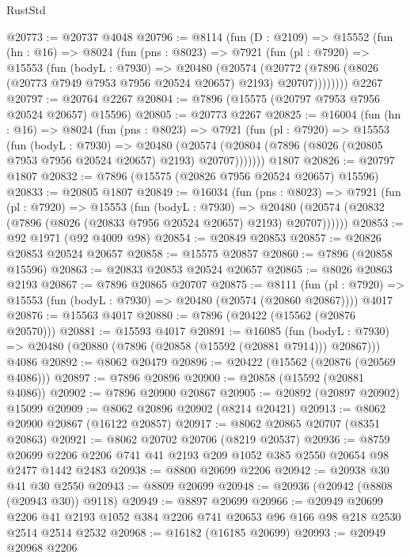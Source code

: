 \begin{lexlean}{RustStd}
\begin{coremodule}
@20773 := @20737 @4048
@20796 := @8114
    (fun (D : @2109) =>
    @15552
      (fun (hn : @16) =>
      @8024
        (fun (pns : @8023) =>
        @7921
          (fun (pl : @7920) =>
          @15553
            (fun (bodyL : @7930) =>
            @20480
              (@20574
                (@20772 (@7896 (@8026 (@20773 @7949 @7953 @7956 @20524 @20657) @2193) @20707))))))))
    @2267
@20797 := @20764 @2267
@20804 := @7896 (@15575 (@20797 @7953 @7956 @20524 @20657) @15596)
@20805 := @20773 @2267
@20825 := @16004
    (fun (hn : @16) =>
    @8024
      (fun (pns : @8023) =>
      @7921
        (fun (pl : @7920) =>
        @15553
          (fun (bodyL : @7930) =>
          @20480
            (@20574 (@20804 (@7896 (@8026 (@20805 @7953 @7956 @20524 @20657) @2193) @20707)))))))
    @1807
@20826 := @20797 @1807
@20832 := @7896 (@15575 (@20826 @7956 @20524 @20657) @15596)
@20833 := @20805 @1807
@20849 := @16034
    (fun (pns : @8023) =>
    @7921
      (fun (pl : @7920) =>
      @15553
        (fun (bodyL : @7930) =>
        @20480 (@20574 (@20832 (@7896 (@8026 (@20833 @7956 @20524 @20657) @2193) @20707))))))
@20853 := @92 @1971 (@92 @4009 @98)
@20854 := @20849 @20853
@20857 := @20826 @20853 @20524 @20657
@20858 := @15575 @20857
@20860 := @7896 (@20858 @15596)
@20863 := @20833 @20853 @20524 @20657
@20865 := @8026 @20863 @2193
@20867 := @7896 @20865 @20707
@20875 := @8111
    (fun (pl : @7920) => @15553 (fun (bodyL : @7930) => @20480 (@20574 (@20860 @20867))))
    @4017
@20876 := @15563 @4017
@20880 := @7896 (@20422 (@15562 (@20876 @20570)))
@20881 := @15593 @4017
@20891 := @16085
    (fun (bodyL : @7930) => @20480 (@20880 (@7896 (@20858 (@15592 (@20881 @7914))) @20867)))
    @4086
@20892 := @8062 @20479
@20896 := @20422 (@15562 (@20876 (@20569 @4086)))
@20897 := @7896 @20896
@20900 := @20858 (@15592 (@20881 @4086))
@20902 := @7896 @20900 @20867
@20905 := @20892 (@20897 @20902) @15099
@20909 := @8062 @20896 @20902 (@8214 @20421)
@20913 := @8062 @20900 @20867 (@16122 @20857)
@20917 := @8062 @20865 @20707 (@8351 @20863)
@20921 := @8062 @20702 @20706 (@8219 @20537)
@20936 := @8759 @20699 @2206 @2206 @741 @41 @2193 @209 @1052 @385 @2550 @20654 @98 @2477 @1442 @2483
@20938 := @8800 @20699 @2206
@20942 := @20938 @30 @41 @30 @2550
@20943 := @8809 @20699
@20948 := @20936 (@20942 (@8808 (@20943 @30)) @9118)
@20949 := @8897 @20699
@20966 := @20949
    @20699
    @2206
    @41
    @2193
    @1052
    @384
    @2206
    @741
    @20653
    @96
    @166
    @98
    @218
    @2530
    @2514
    @2514
    @2532
@20968 := @16182 (@16185 @20699)
@20993 := @20949
    @20968
    @2206

\end{coremodule}
\end{lexlean}

